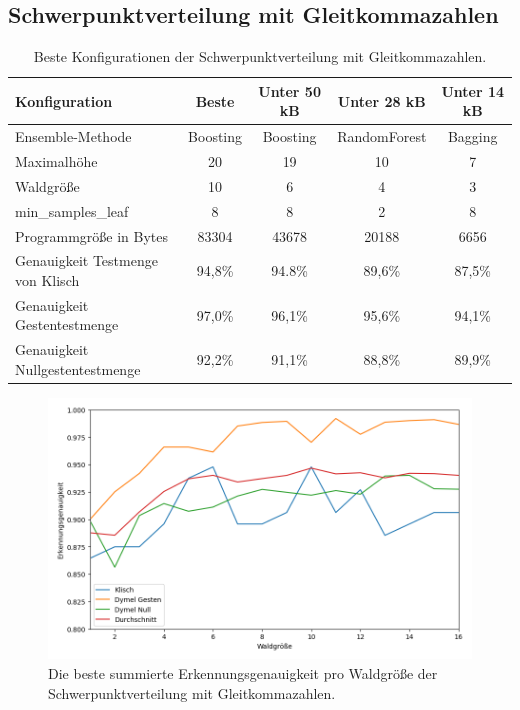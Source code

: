 \subsection{Schwerpunktverteilung mit Gleitkommazahlen}
\begin{table}[h!]
    \hspace{-0.5cm}
    \begin{tabular}{ | l | c | c | c | c |}
        \hline
        Konfiguration & Beste & Unter 50 kB & Unter 28 kB & Unter 14 kB \\\hline
        Ensemble-Methode & Boosting & Boosting & RandomForest & Bagging  \\\hline
        Maximalhöhe & 20 & 19 & 10 & 7 \\\hline
        Waldgröße & 10 & 6 & 4 & 3 \\\hline
        min\_samples\_leaf & 8 & 8 & 2 & 8 \\\hline
        Programmgröße in Bytes & 83304 & 43678 & 20188 & 6656 \\\hline
        Genauigkeit Testmenge von Klisch & 94,8\% & 94.8\% & 89,6\% & 87,5\% \\\hline
        Genauigkeit Gestentestmenge & 97,0\% & 96,1\% & 95,6\% & 94,1\% \\\hline
        Genauigkeit Nullgestentestmenge & 92,2\% & 91,1\% & 88,8\% & 89,9\% \\\hline
    \end{tabular}
    \caption{Beste Konfigurationen der Schwerpunktverteilung mit Gleitkommazahlen.}
    \label{tab:schwerpunktverteilung_float}
\end{table}
\begin{figure}[h!]
    \centering
    \includegraphics[width=\linewidth]{images/cocd_float_acc_per_size.png}
    \caption{Die beste summierte Erkennungsgenauigkeit pro Waldgröße der Schwerpunktverteilung mit Gleitkommazahlen.}
    \label{fig:cocd_float_per_forest_size}
\end{figure}
